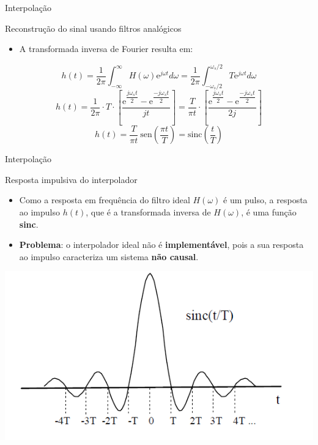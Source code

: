 \begin{frame}{Interpolação}
\begin{block}{Reconstrução do sinal usando filtros analógicos}
\begin{itemize}
    \item A transformada inversa de Fourier resulta em:
\end{itemize}
\begin{equation*}
h(t) = \dfrac{1}{2\pi}\int_{-\infty}^{\infty} H(\omega) \text{e}^{j\omega t} d\omega = \dfrac{1}{2\pi}\int_{-\omega_s/2}^{\omega_s/2} T \text{e}^{j\omega t} d\omega
\end{equation*}
\begin{equation*}
h(t) = \dfrac{1}{2\pi} \cdot T \cdot \left[\dfrac{\text{e}^{\dfrac{j\omega_s t}{2}} - \text{e}^{\dfrac{-j\omega_s t}{2}}}{jt}\right] = \dfrac{T}{\pi t} \cdot \left[\dfrac{\text{e}^{\dfrac{j\omega_s t}{2}} - \text{e}^{\dfrac{-j\omega_s t}{2}}}{2j}\right]
\end{equation*}
\begin{equation*}
h(t) = \dfrac{T}{\pi t} \ \text{sen} \left(\dfrac{\pi t}{T}\right) =  \text{sinc} \left(\dfrac{t}{T}\right)
\end{equation*}
\end{block}
\end{frame}

\begin{frame}{Interpolação}
\begin{block}{Resposta impulsiva do interpolador}
\begin{itemize}
    \item Como a resposta em frequência do filtro ideal $H(\omega)$ é um pulso, a resposta ao impulso $h(t)$, que é a  transformada inversa de $H(\omega)$, é uma função \textbf{sinc}.
    \item \textbf{Problema}: o interpolador ideal não é \textbf{implementável}, pois a sua resposta ao impulso caracteriza um sistema \textbf{não causal}.
\end{itemize}
\end{block}
\vspace{0.5cm}
\centerline{\includegraphics[width=0.6\linewidth]{Figuras/Ch02/fig16.PNG}}
\end{frame}

